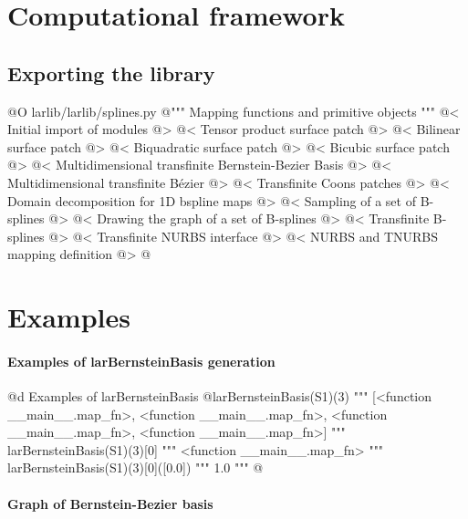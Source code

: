 \documentclass[11pt,oneside]{article}	%
\begin{document}
\section{Computational framework}
\subsection{Exporting the library}
@O larlib/larlib/splines.py
@{""" Mapping functions and primitive objects """
@< Initial import of modules @>
@< Tensor product surface patch @>
@< Bilinear surface patch @>
@< Biquadratic surface patch @>
@< Bicubic surface patch @>
@< Multidimensional transfinite Bernstein-Bezier Basis @>
@< Multidimensional transfinite B\'ezier @>
@< Transfinite Coons patches @>
@< Domain decomposition for 1D bspline maps @>
@< Sampling of a set of B-splines @>
@< Drawing the graph of a set of B-splines @>
@< Transfinite B-splines @>
@< Transfinite NURBS interface @>
@< NURBS and TNURBS mapping definition @>
@}


\section{Examples}

\paragraph{Examples of larBernsteinBasis generation}

@d Examples of larBernsteinBasis
@{larBernsteinBasis(S1)(3) 
""" [<function __main__.map_fn>,
	<function __main__.map_fn>,
	<function __main__.map_fn>,
	<function __main__.map_fn>] """
larBernsteinBasis(S1)(3)[0]
""" <function __main__.map_fn> """
larBernsteinBasis(S1)(3)[0]([0.0])
""" 1.0 """
@}

\paragraph{Graph of Bernstein-Bezier basis}
\end{document}
